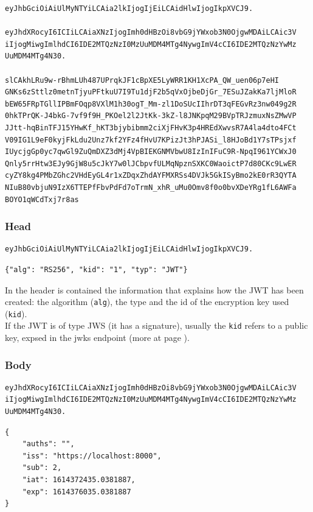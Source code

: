 \documentclass[11pt]{style}
\begin{document}
\begin{lstlisting}
eyJhbGciOiAiUlMyNTYiLCAia2lkIjogIjEiLCAidHlwIjogIkpXVCJ9.

eyJhdXRocyI6ICIiLCAiaXNzIjogImh0dHBzOi8vbG9jYWxob3N0OjgwMDAiLCAic3V
iIjogMiwgImlhdCI6IDE2MTQzNzI0MzUuMDM4MTg4NywgImV4cCI6IDE2MTQzNzYwMz
UuMDM4MTg4N30.

slCAkhLRu9w-rBhmLUh487UPrqkJF1cBpXE5LyWRR1KH1XcPA_QW_uen06p7eHI
GNKs6zSttlz0metnTjyuPFtkuU7I9Tu1djF2b5qVxOjbeDjGr_7ESuJZakKa7ljMloR
bEW65FRpTGllIPBmFOqp8VXlM1h30ogT_Mm-zl1DoSUcIIhrDT3qFEGvRz3nw049g2R
0hkTPrQK-J4bkG-7vf9f9H_PKOel2l2JtKk-3kZ-l8JNKpqM29BVpTRJzmuxNsZMwVP
JJtt-hqBinTFJ15YHwKf_hKT3bjybibmm2ciXjFHvK3p4HREdXwvsR7A4la4dto4FCt
V09IG1L9eF0kyjFkLdu2Unz7kf2YFz4fHvU7KPizJt3hPJASi_l8HJoBd1Y7sTPsjxf
IUycjgGp0yc7qwGl9ZuQmDXZ3dMj4VpBIEKGNMVbwU8IzInIFuC9R-NpqI961YCWxJ0
Qnly5rrHtw3EJy9GjW8u5cJkY7w0lJCbpvfULMqNpznSXKC0WaoictP7d80CKc9LwER
cyZY8kg4PMbZGhc2VHdEyGL4r1xZDqxZhdAYFMXRSs4DVJk5GkISyBmo2kE0rR3QYTA
NIuB80vbjuN9IzX6TTEPfFbvPdFd7oTrmN_xhR_uMu0Omv8f0o0bvXDeYRg1fL6AWFa
BOYO1qWCdTxj7r8as
\end{lstlisting}

\subsubsection{Head}
\begin{lstlisting}
eyJhbGciOiAiUlMyNTYiLCAia2lkIjogIjEiLCAidHlwIjogIkpXVCJ9.
\end{lstlisting}
\begin{lstlisting}
{"alg": "RS256", "kid": "1", "typ": "JWT"}
\end{lstlisting}

In the header is contained the information that explains how the JWT has been
created: the algorithm (\texttt{alg}), the type and the id of the encryption key
used (\texttt{kid}).
\\
If the JWT is of type JWS (it has a signature), usually the \texttt{kid} refers
to a public key, expsed in the jwks endpoint (more at page \pageref{jwks}).

\subsubsection{Body}
\begin{lstlisting}
eyJhdXRocyI6ICIiLCAiaXNzIjogImh0dHBzOi8vbG9jYWxob3N0OjgwMDAiLCAic3V
iIjogMiwgImlhdCI6IDE2MTQzNzI0MzUuMDM4MTg4NywgImV4cCI6IDE2MTQzNzYwMz
UuMDM4MTg4N30.
\end{lstlisting}
\begin{lstlisting}
{
    "auths": "",
    "iss": "https://localhost:8000",
    "sub": 2,
    "iat": 1614372435.0381887,
    "exp": 1614376035.0381887
}
\end{lstlisting}
\end{document}
